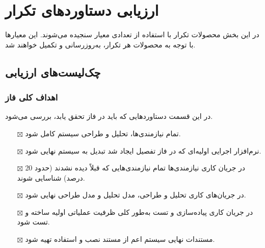 \chapter{ارزیابی دستاوردهای تکرار}
در این بخش محصولات تکرار با استفاده از تعدادی معیار سنجیده می‌شوند. این معیارها با توجه به محصولات هر تکرار، به‌روزرسانی و تکمیل خواهند شد.
\section{چک‌لیست‌های ارزیابی}

\iffalse
Item icons for checklists:	
	\item[$\square$]
	\item[$\boxtimes$]
\fi

\subsection{\hspace*{0.2cm}اهداف کلی فاز }
در این قسمت دستاوردهایی که باید در فاز  تحقق یابد، بررسی می‌شود.
\begin{itemize} \setlength\itemsep{0cm}
	\item[$\boxtimes$]
	تمام نیازمندی‌ها، تحلیل و طراحی سیستم کامل شود.
	\item[$\boxtimes$]
	نرم‌افزار اجرایی اولیه‌ای که در فاز تفصیل ایجاد شد تبدیل به سیستم نهایی شود.
	\item[$\boxtimes$]
	در جریان کاری نیازمندی‌ها تمام نیازمندی‌هایی که قبلاً دیده نشدند (حدود 20 درصد) شناسایی شوند.
	\item[$\boxtimes$]
	در جریان‌های کاری تحلیل و طراحی، مدل تحلیل و مدل طراحی نهایی شود.
	\item[$\boxtimes$]
	در جریان کاری پیاده‌سازی و تست به‌طور کلی ظرفیت عملیاتی اولیه ساخته و تست شود.
	\item[$\boxtimes$]
	مستندات نهایی سیستم اعم از مستند نصب و استفاده تهیه شود.
	
\end{itemize}


